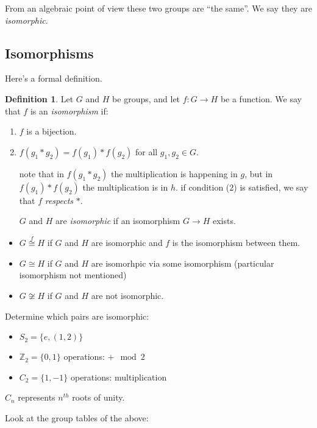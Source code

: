 \documentclass{article}
\theoremstyle{definition} \newtheorem*{definition}{Definition}
\newcommand{\ism}{\cong} \newcommand{\elemt}[2]{#1_{{#2}\sigma(#2)}}
\begin{document}
From an algebraic point of view these two groups are ``the same''. We say they
are \textit{isomorphic}.  \subsection{Isomorphisms} Here's a formal definition.\\


\begin{definition} Let $G$ and $H$ be groups, and let $f : G \rightarrow H$ be
a function. We say that $f$ is an \emph{isomorphism} if: \begin{enumerate}
  \item $f$ is a bijection.  \item $f(g_1 * g_2)=f(g_1) * f(g_2) $ for all
    $g_1, g_2 \in G$.

note that in $f(g_1 * g_2)$ the multiplication is happening in $g$, but in
$f(g_1) * f(g_2)$ the multiplication is in $h$. if condition (2) is satisfied,
we say that $f$ \emph{respects} $*$.

$G$ and $H$ are \emph{isomorphic} if an isomorphism $G \rightarrow H$ exists.
\end{enumerate} \end{definition}

\begin{itemize} \item $G \overset{f}{\ism} H$ if $G$ and $H$ are isomorphic and
    $f$ is the isomorphism between them.  \item $G \ism H$ if $G$ and $H$ are
    isomorhpic via some isomorphism (particular isomorphism not mentioned)
  \item $G \not\ism H$ if $G$ and $H$ are not isomorphic.\\ \end{itemize}
\begin{exmps} Determine which pairs are isomorphic:

\begin{itemize} \item $S_2=\{e, (1, 2)\}$ \item $\mathbb{Z}_2=\{0,1\}$
    operations: $+\mod 2$ \item $C_2=\{1,-1\}$ operations: multiplication
  \end{itemize} $C_n$ represents $n^{th}$ roots of unity.
  
\end{exmps}

Look at the group tables of the above:
\end{document}
